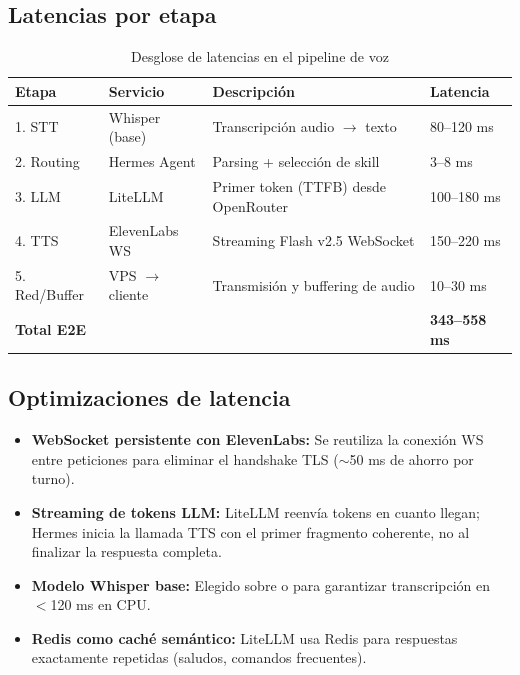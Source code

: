 \subsection{Latencias por etapa}

\begin{table}[h]
\centering
\caption{Desglose de latencias en el pipeline de voz}
\begin{tabularx}{\textwidth}{llXl}
\toprule
\textbf{Etapa} & \textbf{Servicio} & \textbf{Descripción} & \textbf{Latencia} \\
\midrule
1. STT        & Whisper (base) & Transcripción audio $\to$ texto      & 80--120 ms \\
2. Routing    & Hermes Agent   & Parsing + selección de skill          & 3--8 ms    \\
3. LLM        & LiteLLM        & Primer token (TTFB) desde OpenRouter  & 100--180 ms \\
4. TTS        & ElevenLabs WS  & Streaming Flash v2.5 WebSocket        & 150--220 ms \\
5. Red/Buffer & VPS $\to$ cliente & Transmisión y buffering de audio   & 10--30 ms  \\
\midrule
\textbf{Total E2E} & & & \textbf{343--558 ms} \\
\bottomrule
\end{tabularx}
\end{table}

\subsection{Optimizaciones de latencia}

\begin{itemize}
  \item \textbf{WebSocket persistente con ElevenLabs:} Se reutiliza la
    conexión WS entre peticiones para eliminar el handshake TLS ($\sim$50 ms
    de ahorro por turno).
  \item \textbf{Streaming de tokens LLM:} LiteLLM reenvía tokens en
    cuanto llegan; Hermes inicia la llamada TTS con el primer fragmento
    coherente, no al finalizar la respuesta completa.
  \item \textbf{Modelo Whisper base:} Elegido sobre  o
     para garantizar transcripción en $<$120 ms en CPU.
  \item \textbf{Redis como caché semántico:} LiteLLM usa Redis para
    respuestas exactamente repetidas (saludos, comandos frecuentes).
\end{itemize}

